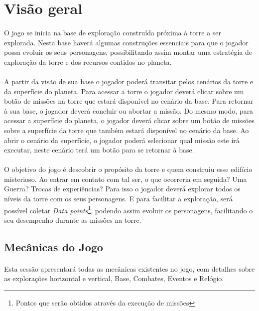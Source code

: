 \documentclass[11pt]{article} %
\begin{document}
\section{Visão geral}

\paragraph{}O jogo se inicia na base de exploração construída próxima à torre a ser explorada. Nesta base haverá algumas construções essenciais para que o jogador possa evoluir os seus personagens, possibilitando assim montar uma estratégia de exploração da torre e dos recursos contidos no planeta.

\paragraph{}A partir da visão de sua base o jogador poderá transitar pelos cenários da torre e da superfície do planeta. Para acessar a torre o jogador deverá clicar sobre um botão de missões na torre que estará disponível no cenário da base. Para retornar à sua base, o jogador deverá concluir ou abortar a missão. Do mesmo modo, para acessar a superfície do planeta, o jogador deverá clicar sobre um botão de missões sobre a superfície da torre que também estará disponível no cenário da base. Ao abrir o cenário da superfície, o jogador poderá selecionar qual missão este irá executar, neste cenário terá um botão para se retornar à base.

\paragraph{}O objetivo do jogo é descobrir o propósito da torre e quem construiu esse edifício misterioso. Ao entrar em contato com tal ser, o que ocorreria em seguida? Uma Guerra? Trocas de experiências? Para isso o jogador deverá explorar todos os níveis da torre com os seus personagens. E para facilitar a exploração, será possível coletar \textit{Data points}\footnote{Pontos que serão obtidos através da execução de missões}, podendo assim evoluir os personagens, facilitando o seu desempenho durante as missões na torre. 

\subsection{Mecânicas do Jogo}
\paragraph{}Esta sessão apresentará todas as mecânicas existentes no jogo, com detalhes sobre as explorações horizontal e vertical, Base, Combates, Eventos e Relógio.
\end{document}
